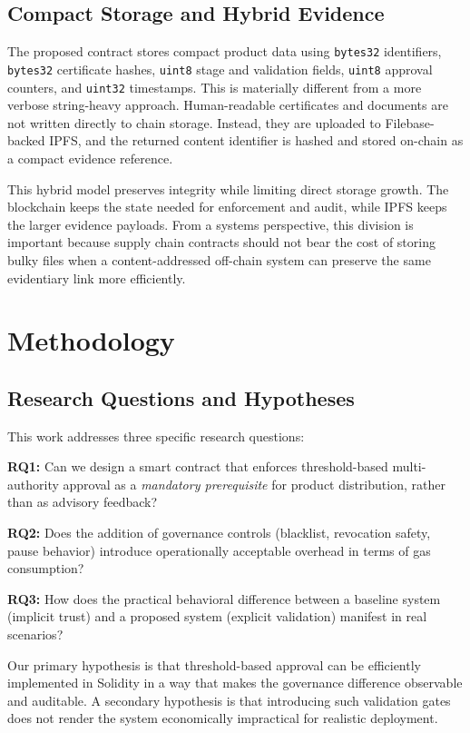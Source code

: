 \documentclass[conference]{IEEEtran}
\begin{document}
\subsection{Compact Storage and Hybrid Evidence}

The proposed contract stores compact product data using \texttt{bytes32} identifiers, \texttt{bytes32} certificate hashes, \texttt{uint8} stage and validation fields, \texttt{uint8} approval counters, and \texttt{uint32} timestamps. This is materially different from a more verbose string-heavy approach. Human-readable certificates and documents are not written directly to chain storage. Instead, they are uploaded to Filebase-backed IPFS, and the returned content identifier is hashed and stored on-chain as a compact evidence reference.

This hybrid model preserves integrity while limiting direct storage growth. The blockchain keeps the state needed for enforcement and audit, while IPFS keeps the larger evidence payloads. From a systems perspective, this division is important because supply chain contracts should not bear the cost of storing bulky files when a content-addressed off-chain system can preserve the same evidentiary link more efficiently.

\section{Methodology}

\subsection{Research Questions and Hypotheses}

This work addresses three specific research questions:

\textbf{RQ1:} Can we design a smart contract that enforces threshold-based multi-authority approval as a \textit{mandatory prerequisite} for product distribution, rather than as advisory feedback?

\textbf{RQ2:} Does the addition of governance controls (blacklist, revocation safety, pause behavior) introduce operationally acceptable overhead in terms of gas consumption?

\textbf{RQ3:} How does the practical behavioral difference between a baseline system (implicit trust) and a proposed system (explicit validation) manifest in real scenarios?

Our primary hypothesis is that threshold-based approval can be efficiently implemented in Solidity in a way that makes the governance difference observable and auditable. A secondary hypothesis is that introducing such validation gates does not render the system economically impractical for realistic deployment.
\end{document}
